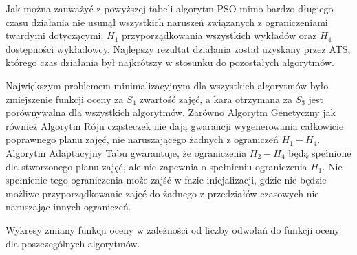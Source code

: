 \par Jak można zauważyć z powyższej tabeli algorytm PSO mimo bardzo długiego czasu działania nie usunął wszystkich naruszeń związanych z ograniczeniami twardymi dotyczącymi: ${H}_{1}$ przyporządkowania wszystkich wykładów oraz $H_{4}$ dostępności wykładowcy. Najlepszy rezultat działania został uzyskany przez ATS, którego czas działania był najkrótszy w stosunku do pozostałych algorytmów. 
\par Największym problemem minimalizacyjnym dla wszystkich algorytmów było zmiejszenie funkcji oceny za $S_{4}$ zwartość zajęć, a kara otrzymana za $S_{3}$ jest porównywalna dla wszystkich algorytmów. 
Zarówno Algorytm Genetyczny jak również Algorytm Róju cząsteczek nie dają gwarancji wygenerowania całkowicie poprawnego planu zajęć, nie naruszającego żadnych z ograniczeń $H_{1}-H_{4}$. Algorytm Adaptacyjny Tabu gwarantuje, że ograniczenia $H_{2}-H_{4}$ będą spełnione dla stworzonego planu zajęć, ale nie zapewnia o spełnieniu ograniczenia ${H}_{1}$. Nie spełnienie tego ograniczenia może zajść w fazie inicjalizacji, gdzie nie będzie możliwe przyporządkowanie zajęć do żadnego z przedziałów czasowych nie naruszając innych ograniczeń.
\par  Wykresy zmiany funkcji oceny w zależności od liczby odwołań do funkcji oceny dla poszczególnych algorytmów.
